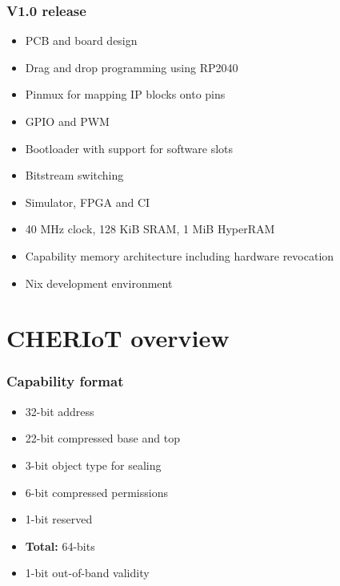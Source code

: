\begin{frame}
  \frametitle{V1.0 release}
  \begin{itemize}
    \item PCB and board design
    \item Drag and drop programming using RP2040
    \item Pinmux for mapping IP blocks onto pins
    \item GPIO and PWM
    \item Bootloader with support for software slots
    \item Bitstream switching
    \item Simulator, FPGA and CI
    \item 40 MHz clock, 128 KiB SRAM, 1 MiB HyperRAM
    \item Capability memory architecture including hardware revocation
    \item Nix development environment
  \end{itemize}
\end{frame}

\section{CHERIoT overview}

\begin{frame}
    \frametitle{Capability format}

    \begin{itemize}
        \item 32-bit address
        \item 22-bit compressed base and top
        \item 3-bit object type for sealing
        \item 6-bit compressed permissions
        \item 1-bit reserved
        \item \textbf{Total:} 64-bits
        \item 1-bit out-of-band validity
    \end{itemize}
\end{frame}

